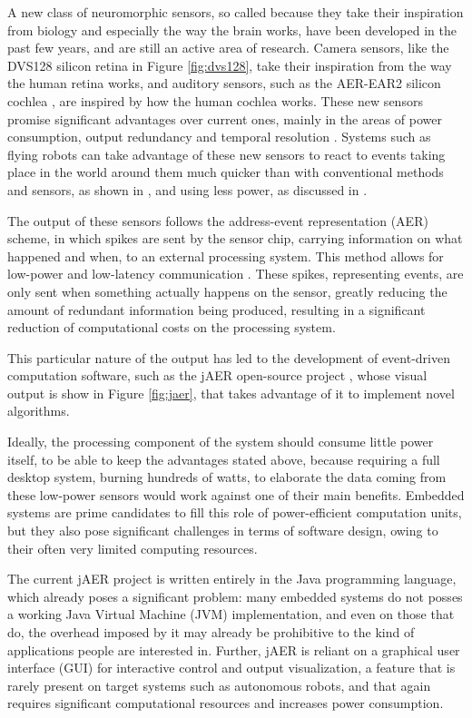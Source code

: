 \documentclass[a4paper,12pt]{report}
\begin{document}
A new class of neuromorphic sensors, so called because they take their inspiration from biology and especially the way the brain works, have been developed in the past few years, and are still an active area of research.
Camera sensors, like the DVS128 silicon retina \cite{dvs128_paper} in Figure \ref{fig:dvs128}, take their inspiration from the way the human retina works, and auditory sensors, such as the AER-EAR2 silicon cochlea \cite{cochlea_paper}, are inspired by how the human cochlea works.
These new sensors promise significant advantages over current ones, mainly in the areas of power consumption, output redundancy and temporal resolution \cite{neuromorphic_systems}.
Systems such as flying robots can take advantage of these new sensors to react to events taking place in the world around them much quicker than with conventional methods and sensors, as shown in \cite{dvs_led_tracking}, and using less power, as discussed in \cite{fast_motor_control}.

The output of these sensors follows the address-event representation (AER) scheme, in which spikes are sent by the sensor chip, carrying information on what happened and when, to an external processing system. This method allows for low-power and low-latency communication \cite{neuromorphic_systems}.
These spikes, representing events, are only sent when something actually happens on the sensor, greatly reducing the amount of redundant information being produced, resulting in a significant reduction of computational costs on the processing system.

This particular nature of the output has led to the development of event-driven computation software, such as the jAER open-source project \cite{jaer_project}, whose visual output is show in Figure \ref{fig:jaer}, that takes advantage of it to implement novel algorithms.

Ideally, the processing component of the system should consume little power itself, to be able to keep the advantages stated above, because requiring a full desktop system, burning hundreds of watts, to elaborate the data coming from these low-power sensors would work against one of their main benefits.
Embedded systems are prime candidates to fill this role of power-efficient computation units, but they also pose significant challenges in terms of software design, owing to their often very limited computing resources.

The current jAER project is written entirely in the Java programming language, which already poses a significant problem: many embedded systems do not posses a working Java Virtual Machine (JVM) implementation, and even on those that do, the overhead imposed by it may already be prohibitive to the kind of applications people are interested in. Further, jAER is reliant on a graphical user interface (GUI) for interactive control and output visualization, a feature that is rarely present on target systems such as autonomous robots, and that again requires significant computational resources and increases power consumption.
\end{document}

